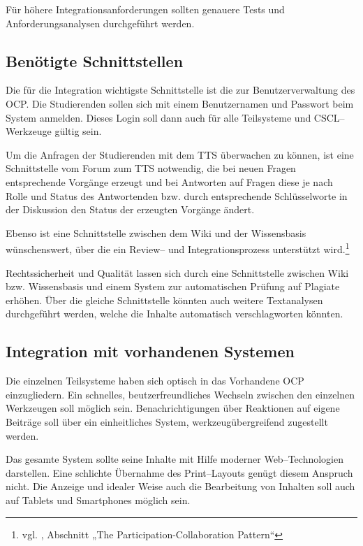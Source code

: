 Für höhere Integrationsanforderungen sollten genauere Tests und Anforderungsanalysen durchgeführt werden.

\subsection{Benötigte Schnittstellen} %
\label{sub:benotigte_schnittstellen}
Die für die Integration wichtigste Schnittstelle ist die zur Benutzerverwaltung des \ac{OCP}. Die Studierenden sollen sich mit einem Benutzernamen und Passwort beim System anmelden. Dieses Login soll dann auch für alle Teilsysteme und CSCL–Werkzeuge gültig sein.

Um die Anfragen der Studierenden mit dem \ac{TTS} überwachen zu können, ist eine Schnittstelle vom Forum zum \ac{TTS} notwendig, die bei neuen Fragen entsprechende Vorgänge erzeugt und bei Antworten auf Fragen diese je nach Rolle und Status des Antwortenden bzw. durch entsprechende Schlüsselworte in der Diskussion den Status der erzeugten Vorgänge ändert.

Ebenso ist eine Schnittstelle zwischen dem Wiki und der Wissensbasis wünschenswert, über die ein Review-- und Integrationsprozess unterstützt wird.\footnote{vgl. \cite{governor}, Abschnitt „The Participation-Collaboration Pattern“}

Rechtssicherheit und Qualität lassen sich durch eine Schnittstelle zwischen Wiki bzw. Wissensbasis und einem System zur automatischen Prüfung auf Plagiate erhöhen. Über die gleiche Schnittstelle könnten auch weitere Textanalysen durchgeführt werden, welche die Inhalte automatisch verschlagworten könnten.

\subsection{Integration mit vorhandenen Systemen} %
\label{sub:integration_mit_vorhandenen_systemen}
Die einzelnen Teilsysteme haben sich optisch in das Vorhandene \ac{OCP} einzugliedern. Ein schnelles, beutzerfreundliches Wechseln zwischen den einzelnen Werkzeugen soll möglich sein. Benachrichtigungen über Reaktionen auf eigene Beiträge soll über ein einheitliches System, werkzeugübergreifend zugestellt werden.

Das gesamte System sollte seine Inhalte mit Hilfe moderner Web–Technologien darstellen. Eine schlichte Übernahme des Print–Layouts genügt diesem Anspruch nicht. Die Anzeige und idealer Weise auch die Bearbeitung von Inhalten soll auch auf Tablets und Smartphones möglich sein.
 
